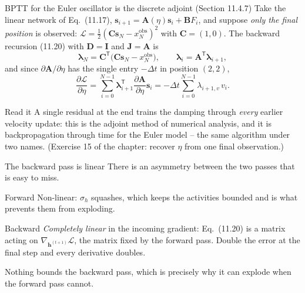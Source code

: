 \documentclass[10pt,aspectratio=169]{beamer}
\begin{document}
\begin{frame}{BPTT for the Euler oscillator is the discrete adjoint (Section 11.4.7)}
Take the linear network of Eq.~(11.17), $\bm{s}_{i+1}=\bm{A}(\eta)\bm{s}_i+\bm{B}F_i$,
and suppose \emph{only the final position} is observed:
$\mathcal{L}=\tfrac12(\bm{C}\bm{s}_N-x_N^{\mathrm{obs}})^2$ with $\bm{C}=(1,0)$.
The backward recursion (11.20) with $\bm{D}=\bm{I}$ and $\bm{J}=\bm{A}$ is
\[
  \bm{\lambda}_N=\bm{C}^{\mathsf{T}}\bigl(\bm{C}\bm{s}_N-x_N^{\mathrm{obs}}\bigr),\qquad
  \bm{\lambda}_i=\bm{A}^{\mathsf{T}}\bm{\lambda}_{i+1},
  \tag{11.36}
\]
and since $\partial\bm{A}/\partial\eta$ has the single entry $-\Delta t$ in
position $(2,2)$,
\[
  \boxed{\;\frac{\partial\mathcal{L}}{\partial\eta}
  =\sum_{i=0}^{N-1}\bm{\lambda}_{i+1}^{\mathsf{T}}\frac{\partial\bm{A}}{\partial\eta}\bm{s}_i
  =-\Delta t\sum_{i=0}^{N-1}\lambda_{i+1,v}\,v_i .\;}
  \tag{11.37}
\]
\begin{block}{Read it}
A single residual at the end trains the damping through \emph{every} earlier
velocity update: this is the adjoint method of numerical analysis, and it is
backpropagation through time for the Euler model -- the same algorithm under
two names.  (Exercise 15 of the chapter: recover $\eta$ from one final
observation.)
\end{block}
\end{frame}


\begin{frame}{The backward pass is linear}
There is an asymmetry between the two passes that is easy to miss.
\begin{block}{Forward}
Non-linear: $\sigma_h$ squashes, which keeps the activities bounded and is
what prevents them from exploding.
\end{block}
\begin{block}{Backward}
\emph{Completely linear} in the incoming gradient: Eq.~(11.20) is a matrix
acting on $\nabla_{\bm{h}^{(t+1)}}\mathcal{L}$, the matrix fixed by the
forward pass.  Double the error at the final step and every derivative
doubles.
\end{block}
\medskip
Nothing bounds the backward pass, which is precisely why it can explode
when the forward pass cannot.
\end{frame}
\end{document}
